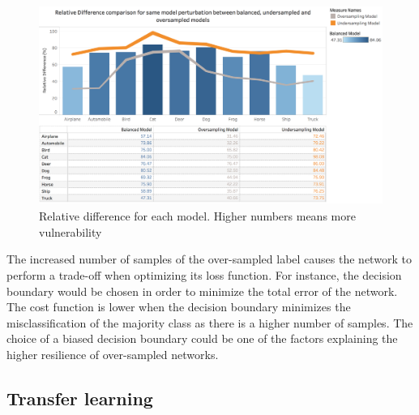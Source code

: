 \documentclass[runningheads,a4paper]{llncs}
\begin{document}
\begin{figure}
	\centering
	\includegraphics[height=6.5cm]{rel_diff_graph.png}
	\caption{Relative difference for each model. Higher numbers means more vulnerability}
	\label{fig:relative_difference}
\end{figure}


The increased number of samples of the over-sampled label causes the network to perform a trade-off when optimizing its loss function. For instance, the decision boundary would be chosen in order to minimize the total error of the network. The cost function is lower when the decision boundary minimizes the misclassification of the majority class as there is a higher number of samples. The choice of a biased decision boundary could be one of the factors explaining the higher resilience of over-sampled networks.

\subsection{Transfer learning}
\end{document}
